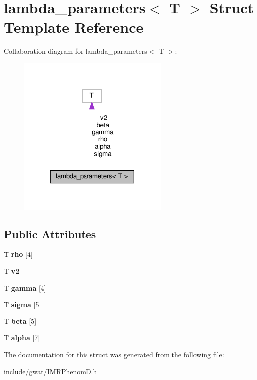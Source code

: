 \hypertarget{structlambda__parameters}{}\section{lambda\+\_\+parameters$<$ T $>$ Struct Template Reference}
\label{structlambda__parameters}


Collaboration diagram for lambda\+\_\+parameters$<$ T $>$\+:\nopagebreak
\begin{figure}[H]
\begin{center}
\leavevmode
\includegraphics[width=206pt]{structlambda__parameters__coll__graph}
\end{center}
\end{figure}
\subsection*{Public Attributes}
\begin{DoxyCompactItemize}
\item 
\mbox{\label{structlambda__parameters_a08f293753fe41b88fdd8a206b593a6c8}} 
T {\bfseries rho} \mbox{[}4\mbox{]}
\item 
\mbox{\label{structlambda__parameters_a35ec87e1f27de9393a6e94d18cd63c52}} 
T {\bfseries v2}
\item 
\mbox{\label{structlambda__parameters_a49db18626c20bd43f25c5c760679ac2a}} 
T {\bfseries gamma} \mbox{[}4\mbox{]}
\item 
\mbox{\label{structlambda__parameters_aefdccc025bcb819ec4b8009b232cf9b2}} 
T {\bfseries sigma} \mbox{[}5\mbox{]}
\item 
\mbox{\label{structlambda__parameters_a4aa387f5a44b09541304c5e2f8f3aad6}} 
T {\bfseries beta} \mbox{[}5\mbox{]}
\item 
\mbox{\label{structlambda__parameters_aec862d891bc928fb1faf042aff322802}} 
T {\bfseries alpha} \mbox{[}7\mbox{]}
\end{DoxyCompactItemize}


The documentation for this struct was generated from the following file\+:\begin{DoxyCompactItemize}
\item 
include/gwat/\hyperlink{IMRPhenomD_8h}{I\+M\+R\+Phenom\+D.\+h}\end{DoxyCompactItemize}
